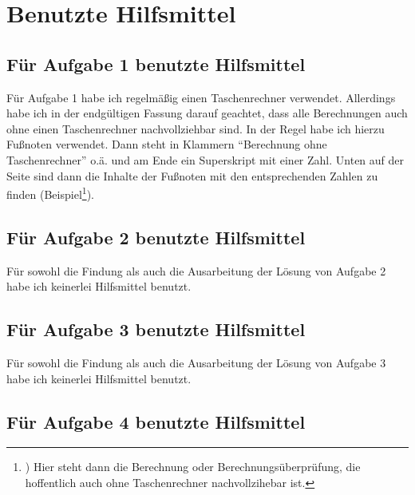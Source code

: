 
\section*{Benutzte Hilfsmittel}

\subsection*{Für Aufgabe 1 benutzte Hilfsmittel}

Für Aufgabe 1 habe ich regelmäßig einen Taschenrechner verwendet. Allerdings habe ich in der endgültigen Fassung 
darauf geachtet, dass alle Berechnungen auch ohne einen Taschenrechner nachvollziehbar sind. In der Regel habe 
ich hierzu Fußnoten verwendet. Dann steht in Klammern "`Berechnung ohne Taschenrechner"' o.ä. und am Ende ein 
Superskript mit einer Zahl. Unten auf der Seite sind dann die Inhalte der Fußnoten mit  den entsprechenden Zahlen 
zu finden (Beispiel\footnote{) Hier steht dann die Berechnung oder Berechnungsüberprüfung, die hoffentlich auch ohne 
Taschenrechner nachvollzihebar ist.}).


\subsection*{Für Aufgabe 2 benutzte Hilfsmittel}

Für sowohl die Findung als auch die Ausarbeitung der Lösung von Aufgabe 2 habe ich keinerlei Hilfsmittel benutzt.

\subsection*{Für Aufgabe 3 benutzte Hilfsmittel}

Für sowohl die Findung als auch die Ausarbeitung der Lösung von Aufgabe 3 habe ich keinerlei Hilfsmittel benutzt.

\subsection*{Für Aufgabe 4 benutzte Hilfsmittel}

